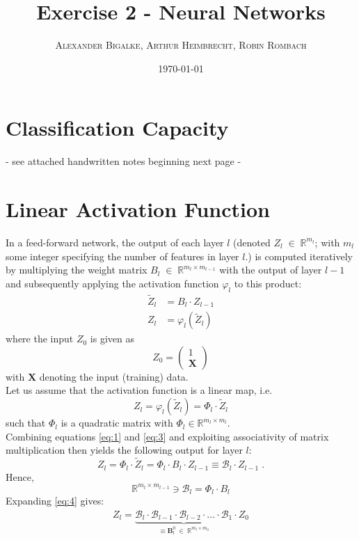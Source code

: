 \documentclass[12pt]{article}
\title{Exercise 2 - Neural Networks} %
\author{%
\textsc{Alexander Bigalke, Arthur Heimbrecht, Robin Rombach}}
\date{\today} %
\begin{document}
\maketitle
\section{Classification Capacity}
- see attached handwritten notes beginning next page - 

\section{Linear Activation Function}
In a feed-forward network, the output of each layer $l$ (denoted $Z_l \; \in \; \mathbb{R}^{m_l}$; with $m_l$ some integer specifying the number of features in layer $l$.) is computed iteratively by multiplying the weight matrix $B_l \; \in \; \mathbb{R}^{m_{l}\times m_{l-1}}$ with the output of layer $l-1$ and subsequently applying the activation function $\varphi_l$ to this product: 
\begin{align}
\tilde{Z}_l &= B_{l} \cdot Z_{l-1} \label{eq:1}\\
Z_l &= \varphi_l(\tilde{Z}_l)
\end{align}
where the input $Z_0$ is given as 
$$ Z_0 = \left( \begin{array}{c}1\\\mathbf{X}\end{array} \right) $$
with $\mathbf{X}$ denoting the input (training) data. \\
\newline
Let us assume that the activation function is a linear map, i.e.
\begin{equation}
Z_l = \varphi_l(\tilde{Z}_l) = \Phi_l \cdot \tilde{Z}_l
\label{eq:3} 
\end{equation} 
such that $\Phi_l$ is a quadratic matrix with $\Phi_l \in \mathbb{R}^{m_l \times m_l}$. \\
Combining equations \eqref{eq:1} and \eqref{eq:3} and exploiting associativity of matrix multiplication then yields the following output for layer $l$:
\begin{equation}
Z_l = \Phi_l \cdot \tilde{Z}_l = \Phi_l \cdot B_l \cdot Z_{l-1} \equiv \mathcal{B}_l \cdot Z_{l-1}\;.
\label{eq:4}
\end{equation}
Hence, $$\mathbb{R}^{m_l \times m_{l-1}}\ni \mathcal{B}_l = \Phi_l \cdot B_l $$
Expanding \eqref{eq:4} gives:
\begin{align}
Z_l = \underbrace{ \mathcal{B}_l \cdot \mathcal{B}_{l-1} \cdot \mathcal{B}_{l-2} \cdot \dots \cdot \mathcal{B}_1}_{\equiv \mathbf{B}_l^0 \: \in \: \mathbb{R}^{m_l \times m_0}} \cdot Z_0 
\label{eq:5}
\end{align}
\end{document}
